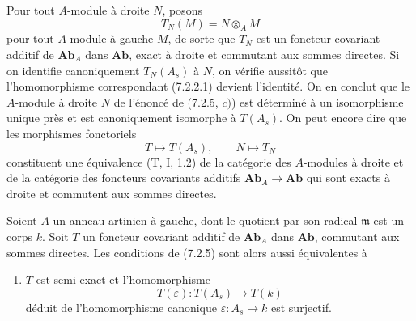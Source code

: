 \begin{remark}[7.2.6]
Pour tout $A$-module à droite $N$, posons
\[
  T_N(M)=N\otimes_A M
\]
pour tout $A$-module à gauche $M$, de sorte que $T_N$ est un foncteur
covariant additif de $\mathbf{Ab}_A$ dans $\mathbf{Ab}$, exact à droite et
commutant aux sommes directes. Si on identifie canoniquement $T_N(A_s)$ à
$N$, on vérifie aussitôt que l'homomorphisme correspondant (7.2.2.1) devient
l'identité. On en conclut que le $A$-module à droite $N$ de l'énoncé de
(7.2.5, $c)$) est déterminé à un isomorphisme unique près et est
canoniquement isomorphe à $T(A_s)$. On peut encore dire que les morphismes
fonctoriels
\[
  T\longmapsto T(A_s),
  \qquad
  N\longmapsto T_N
\]
constituent une équivalence (T, I, 1.2) de la catégorie des $A$-modules à
droite et de la catégorie des foncteurs covariants additifs
$\mathbf{Ab}_A\to\mathbf{Ab}$ qui sont exacts à droite et commutent aux
sommes directes.
\end{remark}

\begin{proposition}[7.2.7]
Soient $A$ un anneau artinien à gauche, dont le quotient par son radical
$\mathfrak m$ est un corps $k$. Soit $T$ un foncteur covariant additif de
$\mathbf{Ab}_A$ dans $\mathbf{Ab}$, commutant aux sommes directes. Les
conditions de (7.2.5) sont alors aussi équivalentes à
\begin{enumerate}
  \item[d)] $T$ est semi-exact et l'homomorphisme
    \[
      T(\varepsilon):T(A_s)\longrightarrow T(k)
    \]
    déduit de l'homomorphisme canonique $\varepsilon:A_s\to k$ est surjectif.
\end{enumerate}
\end{proposition}

